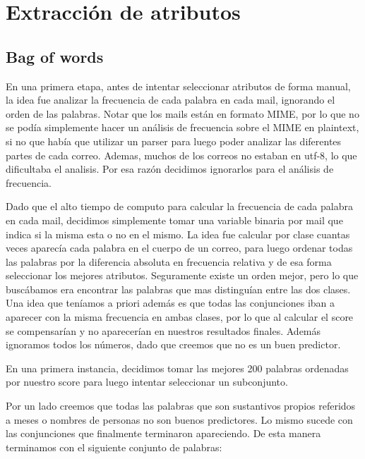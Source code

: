 \documentclass[10pt,a4paper]{article}
\begin{document}
\section{Extracción de atributos}

\subsection{Bag of words}

En una primera etapa, antes de intentar seleccionar atributos de forma manual, la idea fue analizar la frecuencia de cada palabra en cada mail, ignorando el orden de las palabras. Notar que los mails están en formato MIME, por lo que no se podía simplemente hacer un análisis de frecuencia sobre el MIME en plaintext, si no que había que utilizar un parser para luego poder analizar las diferentes partes de cada correo. Ademas, muchos de los correos no estaban en utf-8, lo que dificultaba el analisis. Por esa razón decidimos ignorarlos para el análisis de frecuencia.

Dado que el alto tiempo de computo para calcular la frecuencia de cada palabra en cada mail, decidimos simplemente tomar una variable binaria por mail que indica si la misma esta o no en el mismo. La idea fue calcular por clase cuantas veces aparecía cada palabra en el cuerpo de un correo, para luego ordenar todas las palabras por la diferencia absoluta en frecuencia relativa y de esa forma seleccionar los mejores atributos. Seguramente existe un orden mejor, pero lo que buscábamos era encontrar las palabras que mas distinguían entre las dos clases. Una idea que teníamos a priori además es que todas las conjunciones iban a aparecer con la misma frecuencia en ambas clases, por lo que al calcular el score se compensarían y no aparecerían en nuestros resultados finales. Además ignoramos todos los números, dado que creemos que no es un buen predictor.

En una primera instancia, decidimos tomar las mejores 200 palabras ordenadas por nuestro score para luego intentar seleccionar un subconjunto.

Por un lado creemos que todas las palabras que son sustantivos propios referidos a meses o nombres de personas no son buenos predictores. Lo mismo sucede con las conjunciones que finalmente terminaron apareciendo. De esta manera terminamos con el siguiente conjunto de palabras:
\end{document}
